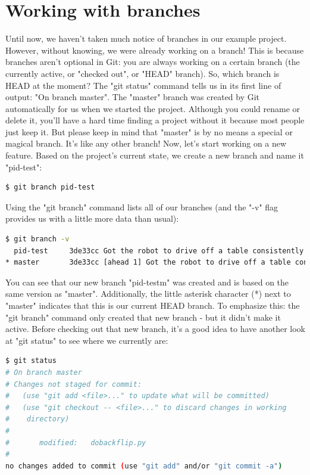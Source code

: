 \documentclass{article}
\begin{document}
\section{Working with branches}
Until now, we haven't taken much notice of branches in our example project. However, without knowing, we were already working on a branch! This is because branches aren't optional in Git: you are always working on a certain branch (the currently active, or "checked out", or "HEAD" branch).
\newline\newline
So, which branch is HEAD at the moment? The "git status" command tells us in its first line of output: "On branch master".
The "master" branch was created by Git automatically for us when we started the project. Although you could rename or delete it, you'll have a hard time finding a project without it because most people just keep it. But please keep in mind that "master" is by no means a special or magical branch. It's like any other branch!
\newline\newline
Now, let's start working on a new feature. Based on the project's current state, we create a new branch and name it "pid-test":
\begin{lstlisting}[language=bash]
$ git branch pid-test
\end{lstlisting}
Using the "git branch" command lists all of our branches (and the "-v" flag provides us with a little more data than usual):
\begin{lstlisting}[language=bash]
$ git branch -v
  pid-test     3de33cc Got the robot to drive off a table consistently
* master       3de33cc [ahead 1] Got the robot to drive off a table consistently
\end{lstlisting}
You can see that our new branch "pid-testm" was created and is based on the same version as "master". Additionally, the little asterisk character (*) next to "master" indicates that this is our current HEAD branch. To emphasize this: the "git branch" command only created that new branch - but it didn't make it active. Before checking out that new branch, it's a good idea to have another look at "git status" to see where we currently are:
\begin{lstlisting}[language=bash]
$ git status
# On branch master
# Changes not staged for commit:
#   (use "git add <file>..." to update what will be committed)
#   (use "git checkout -- <file>..." to discard changes in working 
#    directory)
#
#       modified:   dobackflip.py
#
no changes added to commit (use "git add" and/or "git commit -a")
\end{lstlisting}
\end{document}
